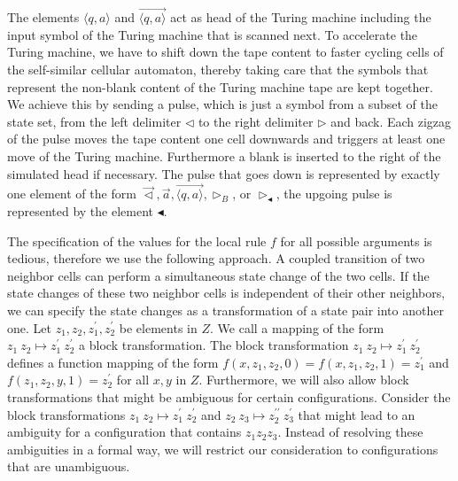 \documentclass[pre,showpacs,showkeys,preprint]{revtex4}
\theoremstyle{definition}
\begin{document}
The elements $\langle q, a \rangle$ and $\overrightarrow{\langle q, a \rangle}$  act as head of the
Turing machine including the input symbol of the Turing machine that is scanned next.
To accelerate the Turing machine, we have to shift down the tape content to faster cycling cells of the self-similar cellular automaton,
thereby taking care that the symbols that represent the non-blank content of the Turing machine tape are kept together.
We achieve this by sending a pulse, which is just a symbol from a subset of the state set,
from the left delimiter $\lhd$ to the right delimiter $\rhd$ and back.
Each zigzag of the pulse moves the tape content one cell downwards and triggers
at least one move of the Turing machine.
Furthermore a blank is inserted to the right of the simulated head if necessary.
The pulse that goes down is represented by exactly one element of the form
$\overrightarrow{\lhd}, \overrightarrow{a}, \overrightarrow{\langle q,a \rangle}, \rhd_B$, or $\rhd_\blacktriangleleft$,
the upgoing pulse is represented by the element $\blacktriangleleft$.

The specification of the values for the local rule $f$ for all possible arguments
is tedious, therefore we use the following approach.
A coupled transition of two neighbor cells can perform a simultaneous state change of the two cells.
If the state changes of these two neighbor cells is independent of their other neighbors,
we can specify the state changes as a transformation of a state pair into another one.
Let $z_1, z_2, z_1^\prime, z_2^\prime$ be elements in $Z$.
We call a mapping of the form $z_1 \: z_2 \mapsto z_1^\prime \: z_2^\prime$ a block transformation.
The block transformation $z_1 \: z_2 \mapsto z_1^\prime \: z_2^\prime$ defines
 a function mapping of the form
$
f(x, z_1, z_2, 0) = f(x, z_1, z_2, 1) = z_1^\prime
$
and
$
f(z_1, z_2,y, 1) = z_2^\prime
$
for all $x, y$ in $Z$.
Furthermore, we will also allow block transformations that might be ambiguous for certain configurations.
Consider the block transformations
$z_1 \: z_2 \mapsto z_1^\prime \: z_2^\prime$
and
$z_2 \: z_3 \mapsto z_2^{\prime\prime} \: z_3^\prime$
that might lead to an ambiguity for a configuration that contains $z_1z_2z_3$.
Instead of resolving these ambiguities in a formal way, we will restrict our consideration to
configurations that are unambiguous.
\end{document}
